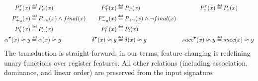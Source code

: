 \documentclass{article}
\newcommand\myeq{\mathrel{\stackrel{\makebox[0pt]{\mbox{\normalfont\tiny def}}}{=}}}
\newcommand{\ap}{\approx}
\begin{document}
\begin{equation}
\begin{aligned}
P^{\tau}_{\sigma}(x)&\myeq P_{\sigma}(x) & P^{\tau}_{T}(x)&\myeq P_{T}(x) & P^{\tau}_{c}(x)&\myeq P_{c}(x) \\
P^{\tau}_{+u}(x)&\myeq P_{+u}(x) \land final(x) & P^{\tau}_{-u}(x)&\myeq P_{+u}(x) \land \neg final(x) \\
P^{\tau}_{h}(x)&\myeq P_{h}(x) & P^{\tau}_{l}(x)&\myeq P_{l}(x) \\
\alpha^{\tau}(x)\ap y &\myeq\alpha(x)\ap y & \delta^{\tau}(x)\ap y &\myeq\delta(x)\ap y & succ^{\tau}(x)\ap y &\myeq succ(x)\ap y \\
\end{aligned}
\end{equation}
The transduction is straight-forward; in our terms, feature changing is redefining unary functions over register features. All other relations (including association, dominance, and linear order) are preserved from the input signature. 


\end{document}
